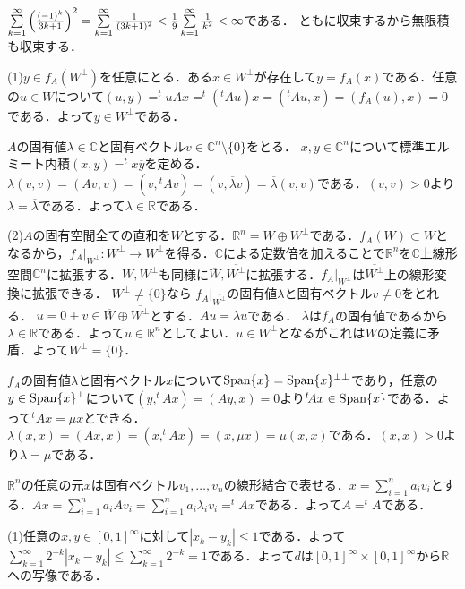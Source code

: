 \documentclass[
		book,
		head_space=20mm,
		foot_space=20mm,
		gutter=10mm,
		line_length=190mm
]{jlreq}
\begin{document}
$\sum\limits_{k=1}^\infty\qty(\frac{(-1)^k}{3k+1})^2=\sum\limits_{k=1}^\infty\frac{1}{(3k+1)^2}<\frac{1}{9}\sum\limits_{k=1}^\infty\frac{1}{k^2}<\infty$である．
ともに収束するから無限積も収束する．

(1)$y \in f_A(W^{\perp})$を任意にとる．ある$x \in W^{\perp}$が存在して$y=f_A(x)$である．任意の$u \in W$について$(u,y)=^t\!u Ax=^t\!(^t\!Au)x=(^t\!Au,x)=(f_A(u),x)=0$である．よって$y \in W^{\perp}$である．

$A$の固有値$\lambda\in \mathbb{C}$と固有ベクトル$v \in \mathbb{C}^n\setminus\{0\}$をとる．
$x,y \in \mathbb{C}^n$について標準エルミート内積$(x,y)=^t\!x\overline{y}$を定める．
$\lambda(v,v)=(Av,v)=(v,\overline{^t\!A}v)=(v,\overline{\lambda}v)=\overline{\lambda}(v,v)$である．$(v,v)>0$より$\lambda=\overline{\lambda}$である．よって$\lambda \in \mathbb{R}$である．

(2)$A$の固有空間全ての直和を$W$とする．$\mathbb{R}^n=W \oplus W^{\perp}$である．$f_A(W)\subset W$となるから，$f_A|_{W^{\perp}} \colon W^{\perp} \rightarrow W^{\perp}$を得る．$\mathbb{C}$による定数倍を加えることで$\mathbb{R}^n$を$\mathbb{C}$上線形空間$\mathbb{C}^n$に拡張する．$W,W^{\perp}$も同様に$\overline{W},\overline{W^{\perp}}$に拡張する．$f_A|_{W^{\perp}}$は$\overline{W^{\perp}}$上の線形変換に拡張できる．
$W^{\perp}\neq \{0\}$なら
$f_A|_{\overline{W^{\perp}}}$の固有値$\lambda$と固有ベクトル$v \neq 0$をとれる．
$u=0+v \in \overline{W}\oplus \overline{W^{\perp}}$とする．$Au=\lambda u$である．
$\lambda$は$f_A$の固有値であるから$\lambda \in \mathbb{R}$である．よって$u \in \mathbb{R}^n$としてよい．$u \in W^{\perp}$となるがこれは$W$の定義に矛盾．よって$W^{\perp}=\{0\}$．

$f_A$の固有値$\lambda$と固有ベクトル$x$について$\mathop{\mathrm{Span}}\{x \}=\mathop{\mathrm{Span}}\{x \}^{\perp\perp}$であり，任意の$y \in \mathop{\mathrm{Span}}\{x \}^{\perp}$について$(y,^t\!Ax)=(Ay,x)=0$より$^t\!A x \in \mathop{\mathrm{Span}}\{x \}$である．よって$^t\!A x = \mu x$とできる．
$\lambda(x,x)=(Ax,x)=(x,^t\!Ax)=(x,\mu x)=\mu(x,x)$である．$(x,x)>0$より$\lambda=\mu$である．

$\mathbb{R}^n$の任意の元$x$は固有ベクトル$v_1,\dots,v_n$の線形結合で表せる．$x=\sum_{i=1}^n a_i v_i$とする．$Ax=\sum_{i=1}^n a_i Av_i=\sum_{i=1}^n a_i \lambda_i v_i=^t\!A x$である．よって$A=^t\!A$である．

(1)任意の$x,y \in [0,1]^\infty$に対して$|x_k-y_k|\le1$である．よって$\sum\limits_{k=1}^\infty 2^{-k}|x_k-y_k|\le\sum\limits_{k=1}^\infty 2^{-k}=1$である．よって$d$は$[0,1]^\infty\times [0,1]^\infty$から$\mathbb{R}$への写像である．
\end{document}
